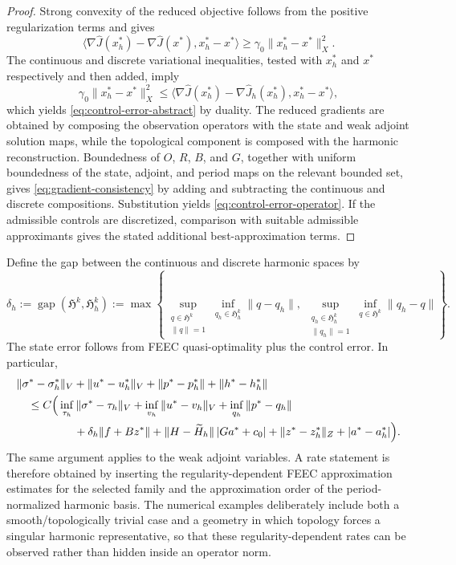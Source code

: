\documentclass{article}
\newcommand{\HH}{\mathfrak H}
\newcommand{\ip}[2]{\langle #1,#2\rangle}
\begin{document}
\begin{proof}
Strong convexity of the reduced objective follows from the positive regularization terms and gives
\[
  \ip{\nabla\widehat J(x_h^*)-\nabla\widehat J(x^*)}{x_h^*-x^*}
  \ge \gamma_0\|x_h^*-x^*\|_X^2.
\]
The continuous and discrete variational inequalities, tested with $x_h^*$ and $x^*$ respectively and then added, imply
\[
  \gamma_0\|x_h^*-x^*\|_X^2
  \le
  \ip{\nabla\widehat J(x_h^*)-\nabla\widehat J_h(x_h^*)}{x_h^*-x^*},
\]
which yields \eqref{eq:control-error-abstract} by duality.  The reduced gradients are obtained by composing the observation operators with the state and weak adjoint solution maps, while the topological component is composed with the harmonic reconstruction.  Boundedness of $O$, $R$, $B$, and $G$, together with uniform boundedness of the state, adjoint, and period maps on the relevant bounded set, gives \eqref{eq:gradient-consistency} by adding and subtracting the continuous and discrete compositions.  Substitution yields \eqref{eq:control-error-operator}.  If the admissible controls are discretized, comparison with suitable admissible approximants gives the stated additional best-approximation terms.
\end{proof}
Define the gap between the continuous and discrete harmonic spaces by
\[
\delta_h
:=
\operatorname{gap}(\HH^k,\HH_h^k)
:=
\max\left\{
\sup_{\substack{q\in\HH^k\\\|q\|=1}}
\inf_{q_h\in\HH_h^k}\|q-q_h\|,
\;
\sup_{\substack{q_h\in\HH_h^k\\\|q_h\|=1}}
\inf_{q\in\HH^k}\|q_h-q\|
\right\}.
\]
The state error follows from FEEC quasi-optimality plus the control error.  In particular,
\begin{equation}
\begin{aligned}
&\|\sigma^*-\sigma_h^*\|_V
+\|u^*-u_h^*\|_V
+\|p^*-p_h^*\|
+\|h^*-h_h^*\|
\\
&\quad\le C\Big(
\inf_{\tau_h}\|\sigma^*-\tau_h\|_V
+
\inf_{v_h}\|u^*-v_h\|_V
+
\inf_{q_h}\|p^*-q_h\|
\\
&\hspace{18mm}
+\delta_h\|f+Bz^*\|
+\|H-\widetilde H_h\|\,|Ga^*+c_0|
+\|z^*-z_h^*\|_Z
+|a^*-a_h^*|
\Big).
\end{aligned}
\end{equation}
The same argument applies to the weak adjoint variables.  A rate statement is therefore obtained by inserting the regularity-dependent FEEC approximation estimates for the selected family and the approximation order of the period-normalized harmonic basis.  The numerical examples deliberately include both a smooth/topologically trivial case and a geometry in which topology forces a singular harmonic representative, so that these regularity-dependent rates can be observed rather than hidden inside an operator norm.
\end{document}
